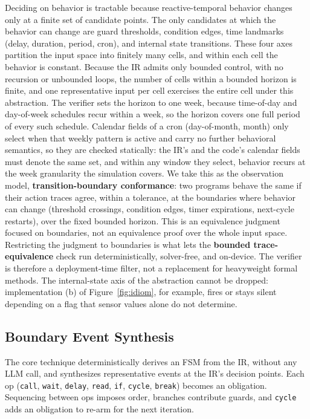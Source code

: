 \documentclass[sigconf,nonacm,anonymous,review]{acmart}
\begin{document}
Deciding on behavior is tractable because reactive-temporal behavior changes only at a finite set of candidate points. The only candidates at which the behavior can change are guard thresholds, condition edges, time landmarks (delay, duration, period, cron), and internal state transitions. These four axes partition the input space into finitely many cells, and within each cell the behavior is constant. Because the IR admits only bounded control, with no recursion or unbounded loops, the number of cells within a bounded horizon is finite, and one representative input per cell exercises the entire cell under this abstraction. The verifier sets the horizon to one week, because time-of-day and day-of-week schedules recur within a week, so the horizon covers one full period of every such schedule. Calendar fields of a cron (day-of-month, month) only select when that weekly pattern is active and carry no further behavioral semantics, so they are checked statically: the IR's and the code's calendar fields must denote the same set, and within any window they select, behavior recurs at the week granularity the simulation covers. We take this as the observation model, \textbf{transition-boundary conformance}: two programs behave the same if their action traces agree, within a tolerance, at the boundaries where behavior can change (threshold crossings, condition edges, timer expirations, next-cycle restarts), over the fixed bounded horizon. This is an equivalence judgment focused on boundaries, not an equivalence proof over the whole input space. Restricting the judgment to boundaries is what lets the \textbf{bounded trace-equiva\-lence} check run deterministically, solver-free, and on-device. The verifier is therefore a deployment-time filter, not a replacement for heavyweight formal methods. The internal-state axis of the abstraction cannot be dropped: implementation (b) of Figure~\ref{fig:idiom}, for example, fires or stays silent depending on a flag that sensor values alone do not determine.

\subsection{Boundary Event Synthesis}

The core technique deterministically derives an FSM from the IR, without any LLM call, and synthesizes representative events at the IR's decision points. Each op (\texttt{call}, \texttt{wait}, \texttt{delay}, \texttt{read}, \texttt{if}, \texttt{cycle}, \texttt{break}) becomes an obligation. Sequencing between ops imposes order, branches contribute guards, and \texttt{cycle} adds an obligation to re-arm for the next iteration.
\end{document}
